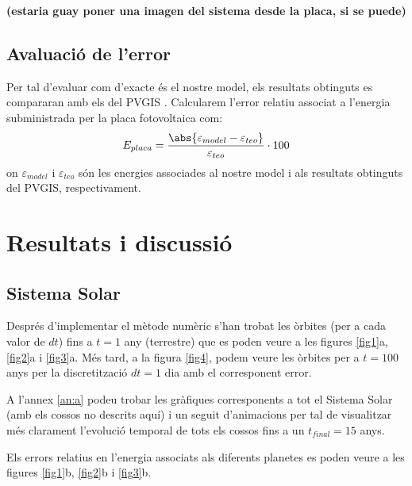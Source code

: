 \documentclass[10pt, twoside, a4paper]{article}
\begin{document}
\textbf{(estaria guay poner una imagen del sistema desde la placa, si se puede)}

\subsection{Avaluació de l'error}
Per tal d'evaluar com d'exacte és el nostre model, els resultats obtinguts es compararan amb els del PVGIS \cite{ref7}. Calcularem l'error relatiu associat a l'energia subministrada per la placa fotovoltaica com:
\begin{equation}
    E_{placa} = \frac{\abs{\varepsilon_{model}-\varepsilon_{teo}}}{\varepsilon_{teo}}\cdot 100
\end{equation}
on $\varepsilon_{model}$ i $\varepsilon_{teo}$ són les energies associades al nostre model i als resultats obtinguts del PVGIS, respectivament.

\section{Resultats i discussió}

\subsection{Sistema Solar}
Després d'implementar el mètode numèric s'han trobat les òrbites (per a cada valor de $dt$) fins a $t=1$ any (terrestre) que es poden veure a les figures \ref{fig1}a, \ref{fig2}a i \ref{fig3}a. Més tard, a la figura \ref{fig4}, podem veure les òrbites per a $t=100$ anys per la discretització $dt=1$ dia amb el corresponent error.
 
A l'annex \ref{an:a} podeu trobar les gràfiques corresponents a tot el Sistema Solar (amb els cossos no descrits aquí) i un seguit d'animacions per tal de visualitzar més clarament l'evolució temporal de tots els cossos fins a un $t_{final}=15$ anys.

Els errors relatius en l'energia associats als diferents planetes es poden veure a les figures \ref{fig1}b, \ref{fig2}b i \ref{fig3}b.
\end{document}
